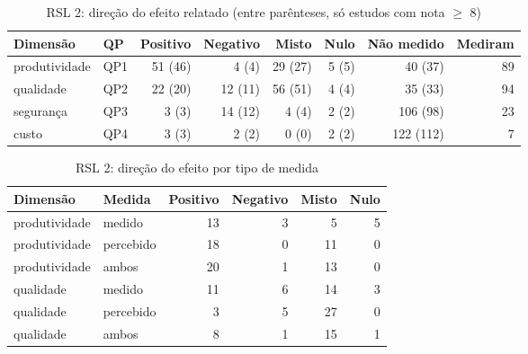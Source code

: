 \begin{table}[htbp]
\centering
\caption{RSL 2: direção do efeito relatado (entre parênteses, só estudos com nota $\geq$ 8)}
\label{tab:direcao-rsl2}
\small
\begin{tabular}{llrrrrrr}
\hline
\textbf{Dimensão} & \textbf{QP} & \textbf{Positivo} & \textbf{Negativo} & \textbf{Misto} & \textbf{Nulo} & \textbf{Não medido} & \textbf{Mediram} \\
\hline
produtividade & QP1 & 51 (46) & 4 (4) & 29 (27) & 5 (5) & 40 (37) & 89 \\
qualidade & QP2 & 22 (20) & 12 (11) & 56 (51) & 4 (4) & 35 (33) & 94 \\
segurança & QP3 & 3 (3) & 14 (12) & 4 (4) & 2 (2) & 106 (98) & 23 \\
custo & QP4 & 3 (3) & 2 (2) & 0 (0) & 2 (2) & 122 (112) & 7 \\
\hline
\end{tabular}
\end{table}
\begin{table}[htbp]
\centering
\caption{RSL 2: direção do efeito por tipo de medida}
\label{tab:direcao-medida-rsl2}
\small
\begin{tabular}{llrrrr}
\hline
\textbf{Dimensão} & \textbf{Medida} & \textbf{Positivo} & \textbf{Negativo} & \textbf{Misto} & \textbf{Nulo} \\
\hline
produtividade & medido & 13 & 3 & 5 & 5 \\
produtividade & percebido & 18 & 0 & 11 & 0 \\
produtividade & ambos & 20 & 1 & 13 & 0 \\
qualidade & medido & 11 & 6 & 14 & 3 \\
qualidade & percebido & 3 & 5 & 27 & 0 \\
qualidade & ambos & 8 & 1 & 15 & 1 \\
\hline
\end{tabular}
\end{table}
